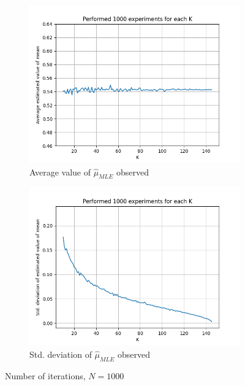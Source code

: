 \documentclass[fleqn, 11pt]{article}
\begin{document}
\vspace{30pt}
\begin{figure}[H]
    \centering
    \begin{subfigure}[H]{0.49\textwidth}
        \centering
        \includegraphics[width=\textwidth]{P1_mu/avgs_1000.png}
        \caption[]{Average value of $\hat{\mu}_{MLE}$ observed}
    \end{subfigure}
    \begin{subfigure}[H]{0.49\textwidth}
        \centering
        \includegraphics[width=\textwidth]{P1_mu/stds_1000.png}
        \caption[]{Std. deviation of $\hat{\mu}_{MLE}$ observed}
    \end{subfigure}
    \caption{Number of iterations, $N = 1000$}
\end{figure}
\newpage
\end{document}
